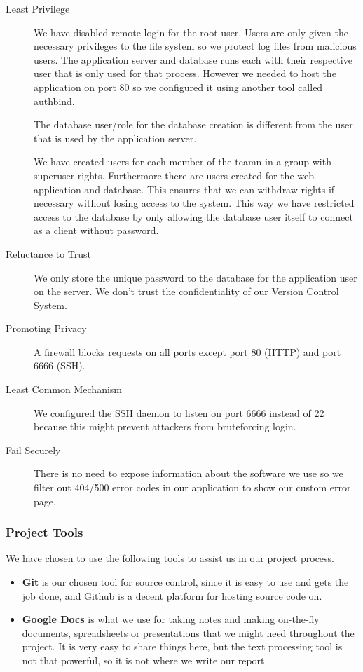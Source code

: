 \documentclass[a4paper]{article}
\begin{document}
\begin{description}
\item[Least Privilege] 

We have disabled remote login for the root user. Users are only given the necessary privileges to the file system so we protect log files from malicious users.
The application server and database runs each with their respective user that is only used for that process. However we needed to host the application on port 80 so we configured it using another tool called authbind.

The database user/role for the database creation is different from the user that is used by the application server. 

We have created users for each member of the teamn in a group with superuser rights. Furthermore there are users created for the web application and database.
This ensures that we can withdraw rights if necessary without losing access to the system.
This way we have restricted access to the database by only allowing the database user itself to connect as a client without password.

\item[Reluctance to Trust]
We only store the unique password to the database for the application user on the server. We don't trust the confidentiality of our Version Control System.

\item[Promoting Privacy]
A firewall blocks requests on all ports except port 80 (HTTP) and port 6666 (SSH).

\item[Least Common Mechanism]
We configured the SSH daemon to listen on port 6666 instead of 22 because this might prevent attackers from bruteforcing login.

\item[Fail Securely]
There is no need to expose information about the software we use so we filter out 404/500 error codes in our application to show our custom error page.
\end{description}

\subsubsection{Project Tools}
We have chosen to use the following tools to assist us in our project process.
\begin{itemize}
\item \textbf{Git} is our chosen tool for source control, since it is easy to use and gets the job done, and Github is a decent platform for hosting source code on.
\item \textbf{Google Docs} is what we use for taking notes and making on-the-fly documents, spreadsheets or presentations that we might need throughout the project. It is very easy to share things here, but the text processing tool is not that powerful, so it is not where we write our report.
\end{itemize}
\end{document}
